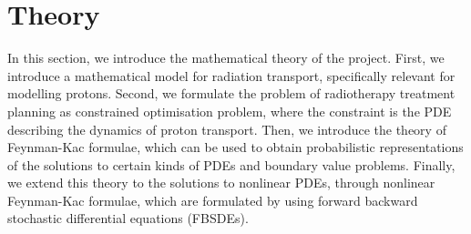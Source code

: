 \section{Theory}\label{sec:theory}

In this section, we introduce the mathematical theory of the project. First, we introduce a mathematical model for radiation transport, specifically relevant for modelling protons. Second, we formulate the problem of radiotherapy treatment planning as constrained optimisation problem, where the constraint is the PDE describing the dynamics of proton transport. Then, we introduce the theory of Feynman-Kac formulae, which can be used to obtain probabilistic representations of the solutions to certain kinds of PDEs and boundary value problems. Finally, we extend this theory to the solutions to nonlinear PDEs, through nonlinear Feynman-Kac formulae, which are formulated by using forward backward stochastic differential equations (FBSDEs).

